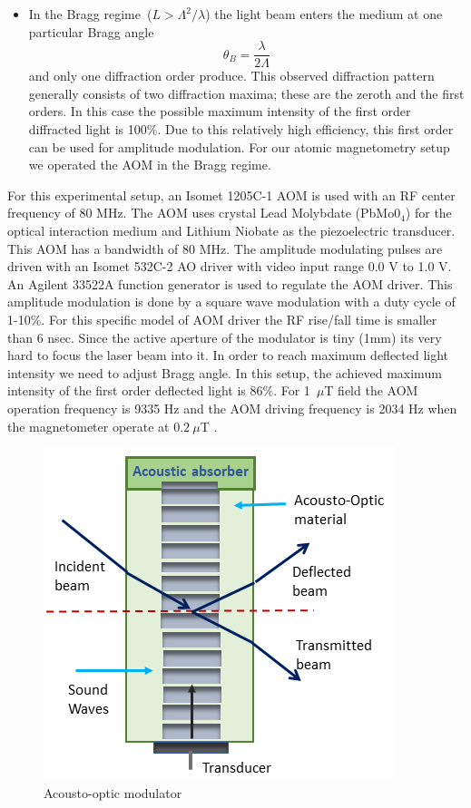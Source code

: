 \begin{itemize}
\item In the Bragg regime~($L > \Lambda^2/\lambda$) the light beam enters the medium at one particular Bragg angle 
\begin{equation}
\theta_B=\frac{\lambda}{2\Lambda}
\end{equation}                                 
and only one diffraction order produce. This observed diffraction pattern generally consists of two diffraction maxima; these are the zeroth and the first orders. In this case the possible maximum intensity of the first order diffracted light is 100\%. Due to this relatively high efficiency, this first order can be used for amplitude modulation. For our atomic magnetometry setup we operated the AOM in the Bragg regime.
\end{itemize}
 For this experimental setup, an Isomet 1205C-1 AOM  is used with an RF center frequency of 80 MHz. The AOM uses crystal Lead Molybdate (PbMo$0_4$) for the optical interaction medium and Lithium Niobate as the piezoelectric transducer. This AOM has a bandwidth of 80 MHz.  The amplitude modulating pulses are driven with an Isomet 532C-2 AO driver with video input range 0.0 V to 1.0 V. An Agilent 33522A function generator is used to regulate the  AOM driver. This amplitude modulation is done by a square wave modulation with a duty cycle of 1-10\%. For this specific model of AOM driver the RF rise/fall time is smaller than 6 nsec. Since the active aperture of the modulator is tiny (1mm) its very hard to focus the laser beam into it. In order to reach maximum deflected light intensity we need to adjust Bragg angle. In this setup, the achieved maximum intensity of the first order deflected light is 86$\%$. For  1~$\mu$T field the AOM operation frequency is 9335 Hz and the AOM driving frequency is 2034 Hz when the magnetometer operate at $0.2~ \mu$T .
\begin{figure}[h]
\centering
\includegraphics[width=0.7\linewidth]{figures/AOM}
\caption{Acousto-optic modulator}
\end{figure}
